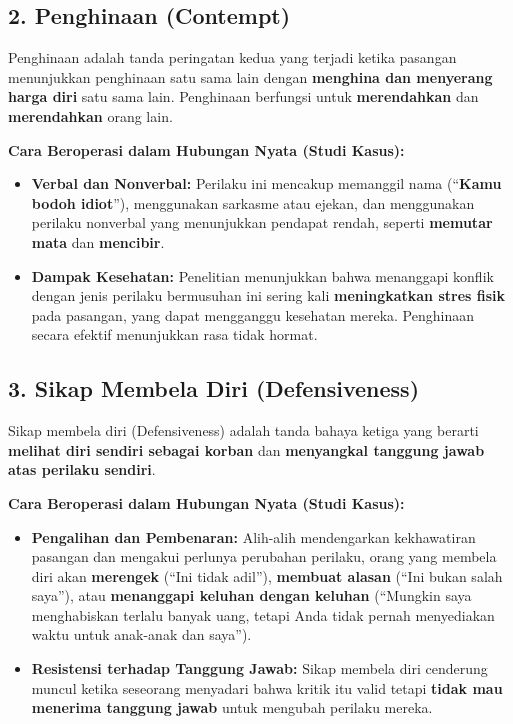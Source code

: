 \documentclass[
  letterpaper,
  DIV=11,
  numbers=noendperiod]{scrreprt}
\providecommand{\tightlist}{%
  \setlength{\itemsep}{0pt}\setlength{\parskip}{0pt}}
\begin{document}
\subsection{2. Penghinaan (Contempt)}\label{penghinaan-contempt}

Penghinaan adalah tanda peringatan kedua yang terjadi ketika pasangan
menunjukkan penghinaan satu sama lain dengan \textbf{menghina dan
menyerang harga diri} satu sama lain. Penghinaan berfungsi untuk
\textbf{merendahkan} dan \textbf{merendahkan} orang lain.

\textbf{Cara Beroperasi dalam Hubungan Nyata (Studi Kasus):}

\begin{itemize}
\tightlist
\item
  \textbf{Verbal dan Nonverbal:} Perilaku ini mencakup memanggil nama
  (``\textbf{Kamu bodoh idiot}''), menggunakan sarkasme atau ejekan, dan
  menggunakan perilaku nonverbal yang menunjukkan pendapat rendah,
  seperti \textbf{memutar mata} dan \textbf{mencibir}.
\item
  \textbf{Dampak Kesehatan:} Penelitian menunjukkan bahwa menanggapi
  konflik dengan jenis perilaku bermusuhan ini sering kali
  \textbf{meningkatkan stres fisik} pada pasangan, yang dapat mengganggu
  kesehatan mereka. Penghinaan secara efektif menunjukkan rasa tidak
  hormat.
\end{itemize}

\subsection{3. Sikap Membela Diri
(Defensiveness)}\label{sikap-membela-diri-defensiveness}

Sikap membela diri (Defensiveness) adalah tanda bahaya ketiga yang
berarti \textbf{melihat diri sendiri sebagai korban} dan
\textbf{menyangkal tanggung jawab atas perilaku sendiri}.

\textbf{Cara Beroperasi dalam Hubungan Nyata (Studi Kasus):}

\begin{itemize}
\tightlist
\item
  \textbf{Pengalihan dan Pembenaran:} Alih-alih mendengarkan
  kekhawatiran pasangan dan mengakui perlunya perubahan perilaku, orang
  yang membela diri akan \textbf{merengek} (``Ini tidak adil''),
  \textbf{membuat alasan} (``Ini bukan salah saya''), atau
  \textbf{menanggapi keluhan dengan keluhan} (``Mungkin saya
  menghabiskan terlalu banyak uang, tetapi Anda tidak pernah menyediakan
  waktu untuk anak-anak dan saya'').
\item
  \textbf{Resistensi terhadap Tanggung Jawab:} Sikap membela diri
  cenderung muncul ketika seseorang menyadari bahwa kritik itu valid
  tetapi \textbf{tidak mau menerima tanggung jawab} untuk mengubah
  perilaku mereka.
\end{itemize}
\end{document}
